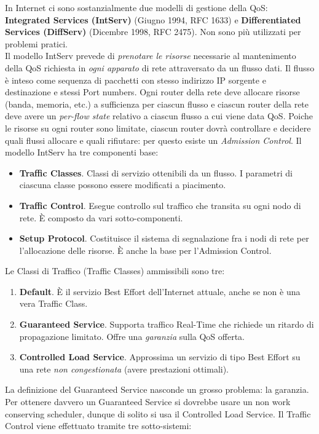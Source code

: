 In Internet ci sono sostanzialmente due modelli di gestione della QoS: \textbf{Integrated Services (IntServ)} (Giugno 1994, RFC 1633) e \textbf{Differentiated Services (DiffServ)} (Dicembre 1998, RFC 2475). Non sono più utilizzati per problemi pratici.\\
Il modello IntServ prevede di \textit{prenotare le risorse} necessarie al mantenimento della QoS richiesta in \textit{ogni apparato} di rete attraversato da un flusso dati. Il flusso è inteso come sequenza di pacchetti con stesso indirizzo IP sorgente e destinazione e stessi Port numbers. Ogni router della rete deve allocare risorse (banda, memoria, etc.) a
sufficienza per ciascun flusso e ciascun router della rete deve avere un \textit{per-flow state} relativo a ciascun flusso a cui viene data QoS. Poiche le risorse su ogni router sono limitate, ciascun router dovrà controllare e decidere quali flussi allocare e quali rifiutare: per questo esiste un \textit{Admission Control}. Il modello IntServ ha tre componenti base:
\begin{itemize}
	\item \textbf{Traffic Classes}. Classi di servizio ottenibili da un flusso. I parametri di ciascuna classe possono essere modificati a piacimento.
	\item \textbf{Traffic Control}. Esegue controllo sul traffico che transita su ogni nodo di rete. È composto da vari sotto-componenti.
	\item \textbf{Setup Protocol}. Costituisce il sistema di segnalazione fra i nodi di rete per l'allocazione delle risorse. È anche la base per l'Admission Control.
\end{itemize}
Le Classi di Traffico (Traffic Classes) ammissibili sono tre:
\begin{enumerate}
	\item \textbf{Default}. È il servizio Best Effort dell'Internet attuale, anche se non è una vera Traffic Class.
	\item \textbf{Guaranteed Service}. Supporta traffico Real-Time che richiede un ritardo di propagazione limitato. Offre una \textit{garanzia} sulla QoS offerta.
	\item \textbf{Controlled Load Service}. Approssima un servizio di tipo Best Effort su una rete \textit{non congestionata} (avere prestazioni ottimali).
\end{enumerate}
La definizione del Guaranteed Service nasconde un grosso problema: la garanzia. Per ottenere davvero un Guaranteed Service si dovrebbe usare un non work conserving scheduler, dunque di solito si usa il Controlled Load Service. Il Traffic Control viene effettuato tramite tre sotto-sistemi:
